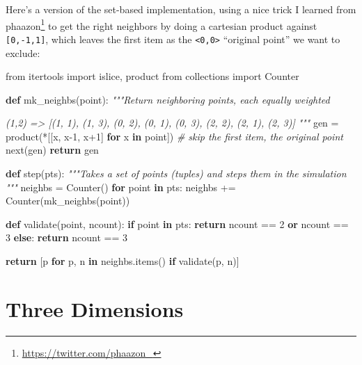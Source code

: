 \documentclass[]{article}
\newenvironment{Shaded}{}{}
\newcommand{\BuiltInTok}[1]{#1}
\newcommand{\CommentTok}[1]{\textcolor[rgb]{0.38,0.63,0.69}{\textit{#1}}}
\newcommand{\ControlFlowTok}[1]{\textcolor[rgb]{0.00,0.44,0.13}{\textbf{#1}}}
\newcommand{\DecValTok}[1]{\textcolor[rgb]{0.25,0.63,0.44}{#1}}
\newcommand{\ImportTok}[1]{#1}
\newcommand{\KeywordTok}[1]{\textcolor[rgb]{0.00,0.44,0.13}{\textbf{#1}}}
\newcommand{\NormalTok}[1]{#1}
\newcommand{\OperatorTok}[1]{\textcolor[rgb]{0.40,0.40,0.40}{#1}}
\renewcommand{\href}[2]{#2\footnote{\url{#1}}}
\begin{document}
Here's a version of the set-based implementation, using a nice trick I learned
from \href{https://twitter.com/phaazon_}{phaazon} to get the right neighbors by
doing a cartesian product against \texttt{{[}0,-1,1{]}}, which leaves the first
item as the \texttt{\textless{}0,0\textgreater{}} ``original point'' we want to
exclude:

\begin{Shaded}
\begin{Highlighting}[]
\ImportTok{from}\NormalTok{ itertools }\ImportTok{import}\NormalTok{ islice, product}
\ImportTok{from}\NormalTok{ collections }\ImportTok{import}\NormalTok{ Counter}

\KeywordTok{def}\NormalTok{ mk\_neighbs(point):}
    \CommentTok{"""Return neighboring points, each equally weighted}

\CommentTok{    (1,2)}
\CommentTok{    => [(1, 1), (1, 3), (0, 2), (0, 1), (0, 3), (2, 2), (2, 1), (2, 3)]}
\CommentTok{    """}
\NormalTok{    gen }\OperatorTok{=}\NormalTok{ product(}\OperatorTok{*}\NormalTok{[[x, x}\DecValTok{{-}1}\NormalTok{, x}\OperatorTok{+}\DecValTok{1}\NormalTok{] }\ControlFlowTok{for}\NormalTok{ x }\KeywordTok{in}\NormalTok{ point])}
    \CommentTok{\# skip the first item, the original point}
    \BuiltInTok{next}\NormalTok{(gen)}
    \ControlFlowTok{return}\NormalTok{ gen}

\KeywordTok{def}\NormalTok{ step(pts):}
    \CommentTok{"""Takes a set of points (tuples) and steps them in the simulation}
\CommentTok{    """}
\NormalTok{    neighbs }\OperatorTok{=}\NormalTok{ Counter()}
    \ControlFlowTok{for}\NormalTok{ point }\KeywordTok{in}\NormalTok{ pts:}
\NormalTok{        neighbs }\OperatorTok{+=}\NormalTok{ Counter(mk\_neighbs(point))}

    \KeywordTok{def}\NormalTok{ validate(point, ncount):}
        \ControlFlowTok{if}\NormalTok{ point }\KeywordTok{in}\NormalTok{ pts:}
            \ControlFlowTok{return}\NormalTok{ ncount }\OperatorTok{==} \DecValTok{2} \KeywordTok{or}\NormalTok{ ncount }\OperatorTok{==} \DecValTok{3}
        \ControlFlowTok{else}\NormalTok{:}
            \ControlFlowTok{return}\NormalTok{ ncount }\OperatorTok{==} \DecValTok{3}

    \ControlFlowTok{return}\NormalTok{ [p }\ControlFlowTok{for}\NormalTok{ p, n }\KeywordTok{in}\NormalTok{ neighbs.items() }\ControlFlowTok{if}\NormalTok{ validate(p, n)]}
\end{Highlighting}
\end{Shaded}

\hypertarget{three-dimensions}{%
\section{Three Dimensions}\label{three-dimensions}}
\end{document}
